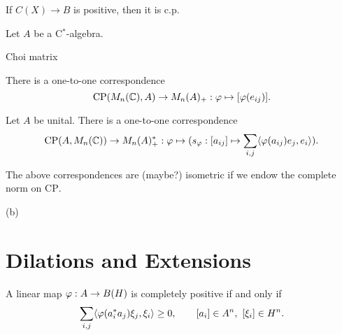 \documentclass{../../large}
\begin{document}
\begin{prb}
If $C(X)\to B$ is positive, then it is c.p.
\end{prb}


\begin{prb}
Let $A$ be a C$^*$-algebra.
\begin{parts}
\item Choi matrix
\item
There is a one-to-one correspondence
\[\mathrm{CP}(M_n(\mathbb{C}),A)\to M_n(A)_+:\varphi\mapsto[\varphi(e_{ij})].\]
\item
Let $A$ be unital.
There is a one-to-one correspondence
\[\mathrm{CP}(A,M_n(\mathbb{C}))\to M_n(A)^*_+:\varphi\mapsto(s_\varphi:[a_{ij}]\mapsto\sum_{i,j}\langle\varphi(a_{ij})e_j,e_i\rangle).\]
\item The above correspondences are (maybe?) isometric if we endow the complete norm on $\mathrm{CP}$.
\end{parts}
\end{prb}
\begin{pf}
(b)


\end{pf}

\section{Dilations and Extensions}

A linear map $\varphi:A\to B(H)$ is completely positive if and only if
\[\sum_{i,j}\langle\varphi(a_i^*a_j)\xi_j,\xi_i\rangle\ge0,\qquad [a_i]\in A^n,\ [\xi_i]\in H^n.\]
\end{document}
